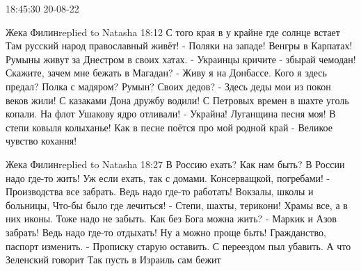  
 
 
 
 

18:45:30 20-08-22

Жека Филинreplied to Natasha
18:12
С того края в у крайне где солнце встает
Там русский народ православный живёт!
-
Поляки на западе! Венгры в Карпатах!
Румыны живут за Днестром в своих хатах.
-
Украинцы кричите - збырай чемодан!
Скажите, зачем мне бежать в Магадан?
-
Живу я на Донбассе.
Кого я здесь предал?
Полка с мадяром? Румын?
Своих дедов?
-
Здесь деды мои из покон веков жили!
С казаками Дона дружбу водили!
С Петровых времен в шахте уголь копали.
На флот Ушакову ядро отливали!
-
Украйна! Луганщина песня моя!
В степи ковыля колыханье!
Как в песне поётся про мой родной край -
Великое чувство кохання!

Жека Филинreplied to Natasha
18:27
В Россию ехать?
Как нам быть?
В России надо где-то жить!
Уж если ехать, так с домами.
Консерващкой, погребами!
-
Производства все забрать.
Ведь надо где-то работать!
Вокзалы, школы и больницы,
Что-бы было где лечиться!
-
Степи, шахты, терикони!
Храмы все, а в них иконы.
Тоже надо не забыть.
Как без Бога можна жить?
-
Маркик и Азов забрать!
Ведь надо где-то отдыхать!
Ну а можно проще быть!
Гражданство, паспорт изменить.
-
Прописку старую оставить. 
С переездом пыл убавить. 
А что Зеленский говорит 
Так пусть в Израиль сам бежит
